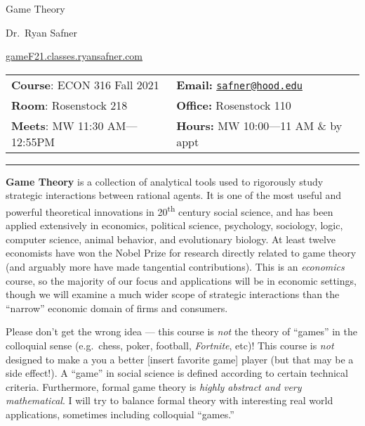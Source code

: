 \documentclass{article}
\begin{document}
\sffamily

\centerline{\Huge Game Theory}

\vspace{3 mm}

\centerline{\large Dr.~Ryan Safner}
\vspace{2 mm}
\centerline{\large \href{http://gameF21.classes.ryansafner.com}{gameF21.classes.ryansafner.com}}

\vspace{5 mm}

\begin{tabular}{@{}p{3.5in}p{3.5in}}           
\textbf{Course}: ECON 316 Fall
2021  & \textbf{Email:}  \href{mailto:safner@hood.edu}{\nolinkurl{safner@hood.edu}}\\
\textbf{Room}: Rosenstock 218 & \textbf{Office:}  Rosenstock 110\\
\textbf{Meets}: MW 11:30 AM---12:55PM & \textbf{Hours:}  MW 10:00---11
AM \& by appt\\ 
\end{tabular}

\vspace{5 mm}

\hrule


\textbf{Game Theory} is a collection of analytical tools used to
rigorously study strategic interactions between rational agents. It is
one of the most useful and powerful theoretical innovations in
20\textsuperscript{th} century social science, and has been applied
extensively in economics, political science, psychology, sociology,
logic, computer science, animal behavior, and evolutionary biology. At
least twelve economists have won the Nobel Prize for research directly
related to game theory (and arguably more have made tangential
contributions). This is an \emph{economics} course, so the majority of
our focus and applications will be in economic settings, though we will
examine a much wider scope of strategic interactions than the ``narrow''
economic domain of firms and consumers.

Please don't get the wrong idea --- this course is \emph{not} the theory
of ``games'' in the colloquial sense (e.g.~chess, poker, football,
\emph{Fortnite}, etc)! This course is \emph{not} designed to make a you
a better {[}insert favorite game{]} player (but that may be a side
effect!). A ``game'' in social science is defined according to certain
technical criteria. Furthermore, formal game theory is \emph{highly
abstract and very mathematical}. I will try to balance formal theory
with interesting real world applications, sometimes including colloquial
``games.''
\end{document}
